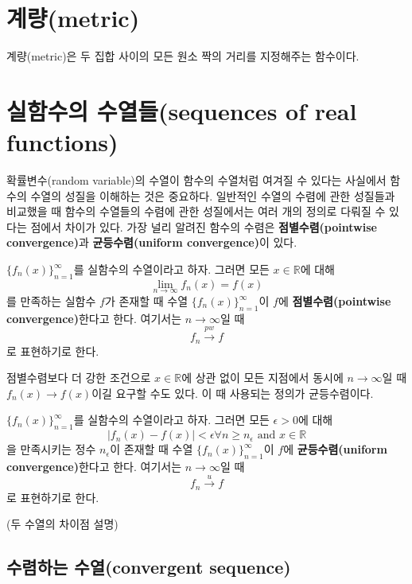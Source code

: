 \documentclass[b5paper,]{scrbook}
\theoremstyle{plain}
\theoremstyle{definition}
\numberwithin{equation}{section}
\let\BeginKnitrBlock\begin \let\EndKnitrBlock\end
\begin{document}
\section{계량(metric)}\label{metric}

계량(metric)은 두 집합 사이의 모든 원소 짝의 거리를 지정해주는 함수이다.

\section{실함수의 수열들(sequences of real
functions)}\label{-sequences-of-real-functions}

확률변수(random variable)의 수열이 함수의 수열처럼 여겨질 수 있다는
사실에서 함수의 수열의 성질을 이해하는 것은 중요하다. 일반적인 수열의
수렴에 관한 성질들과 비교했을 때 함수의 수열들의 수렴에 관한 성질에서는
여러 개의 정의로 다뤄질 수 있다는 점에서 차이가 있다. 가장 널리 알려진
함수의 수렴은 \textbf{점별수렴(pointwise convergence)}과
\textbf{균등수렴(uniform convergence)}이 있다.

\BeginKnitrBlock{definition}[점별수렴]
\protect\hypertarget{def:unnamed-chunk-20}{}{\label{def:unnamed-chunk-20}
{} }\(\{ f_{n}(x)\}_{n=1}^{\infty}\)를 실함수의
수열이라고 하자. 그러면 모든 \(x\in\mathbb{R}\)에 대해
\[\lim_{n\rightarrow \infty}f_{n}(x)=f(x)\] 를 만족하는 실함수 \(f\)가
존재할 때 수열 \(\{ f_{n}(x)\}_{n=1}^{\infty}\)이 \(f\)에
\textbf{점별수렴(pointwise convergence)}한다고 한다. 여기서는
\(n\rightarrow \infty\)일 때 \[f_{n} \stackrel{pw}{\rightarrow} f\] 로
표현하기로 한다.
\EndKnitrBlock{definition}

점별수렴보다 더 강한 조건으로 \(x \in \mathbb{R}\)에 상관 없이 모든
지점에서 동시에 \(n\rightarrow\infty\)일 때
\(f_{n}(x) \rightarrow f(x)\)이길 요구할 수도 있다. 이 때 사용되는
정의가 균등수렴이다.

\BeginKnitrBlock{definition}[균등수렴]
\protect\hypertarget{def:unnamed-chunk-21}{}{\label{def:unnamed-chunk-21}
{} }\(\{ f_{n}(x)\}_{n=1}^{\infty}\)를 실함수의
수열이라고 하자. 그러면 모든 \(\epsilon > 0\)에 대해
\[|f_{n}(x)-f(x)| <\epsilon \forall n \geq n_{\epsilon} \text{ and } x\in \mathbb{R}\]
을 만족시키는 정수 \(n_{\epsilon}\)이 존재할 때 수열
\(\{ f_{n}(x)\}_{n=1}^{\infty}\)이 \(f\)에 \textbf{균등수렴(uniform
convergence)}한다고 한다. 여기서는 \(n\rightarrow \infty\)일 때
\[f_{n} \stackrel{u}{\rightarrow} f\] 로 표현하기로 한다.
\EndKnitrBlock{definition}

(두 수열의 차이점 설명)

\subsection{수렴하는 수열(convergent
sequence)}\label{-convergent-sequence}
\end{document}
